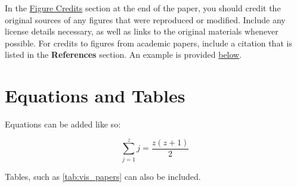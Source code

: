 \documentclass[journal]{vgtc}                     %
\begin{document}
In the \hyperref[sec:figure_credits]{Figure Credits} section at the end of the paper, you should credit the original sources of any figures that were reproduced or modified.
Include any license details necessary, as well as links to the original materials whenever possible.
For credits to figures from academic papers, include a citation that is listed in the \textbf{References} section.
An example is provided \hyperref[sec:figure_credits]{below}.


\section{Equations and Tables}

Equations can be added like so:

\begin{equation}
  \label{eq:sum}
  \sum_{j=1}^{z} j = \frac{z(z+1)}{2}
\end{equation}

Tables, such as \cref{tab:vis_papers} can also be included.
\end{document}
